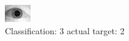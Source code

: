 \begin{figure}[h!]
\begin{center}
\includegraphics[width=0.60\columnwidth]{figures/ID1601_class_3_target_2.png}
\end{center}
\caption{ Classification: 3 actual target: 2}
\label{fig:ID1601_class_3_target_2}
\end{figure}
